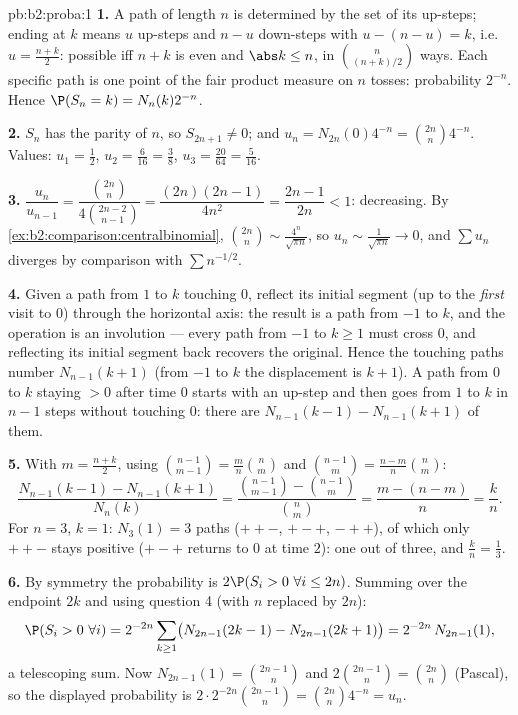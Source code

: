 \begin{solution}{pb:b2:proba:1}
\textbf{1.} A path of length $n$ is determined by the set of
its up-steps; ending at $k$ means $u$ up-steps and $n - u$
down-steps with $u - (n - u) = k$, i.e.\ $u = \frac{n+k}2$:
possible iff $n + k$ is even and $\abs k \leq n$, in
$\binom{n}{(n+k)/2}$ ways. Each specific path is one point of
the fair product measure on $n$ tosses: probability $2^{-n}$.
Hence $\P(S_n = k) = N_n(k)2^{-n}$.

\textbf{2.} $S_n$ has the parity of $n$, so $S_{2n+1} \neq
0$; and $u_n = N_{2n}(0)4^{-n} = \binom{2n}n4^{-n}$. Values:
$u_1 = \frac12$, $u_2 = \frac6{16} = \frac38$, $u_3 =
\frac{20}{64} = \frac5{16}$.

\textbf{3.} $\dfrac{u_n}{u_{n-1}} =
\dfrac{\binom{2n}n}{4\binom{2n-2}{n-1}} =
\dfrac{(2n)(2n-1)}{4n^2} = \dfrac{2n-1}{2n} < 1$: decreasing.
By \cref{ex:b2:comparison:centralbinomial}, $\binom{2n}n \sim
\frac{4^n}{\sqrt{\pi n}}$, so $u_n \sim \frac1{\sqrt{\pi n}}
\to 0$, and $\sum u_n$ diverges by comparison with $\sum
n^{-1/2}$.

\textbf{4.} Given a path from $1$ to $k$ touching $0$,
reflect its initial segment (up to the \emph{first} visit to
$0$) through the horizontal axis: the result is a path from
$-1$ to $k$, and the operation is an involution --- every
path from $-1$ to $k \geq 1$ must cross $0$, and reflecting
its initial segment back recovers the original. Hence the
touching paths number $N_{n-1}(k + 1)$ (from $-1$ to $k$ the
displacement is $k + 1$). A path from $0$ to $k$ staying $>
0$ after time $0$ starts with an up-step and then goes from
$1$ to $k$ in $n - 1$ steps without touching $0$: there are
$N_{n-1}(k-1) - N_{n-1}(k+1)$ of them.

\textbf{5.} With $m = \frac{n+k}2$, using
$\binom{n-1}{m-1} = \frac mn\binom nm$ and $\binom{n-1}{m} =
\frac{n-m}n\binom nm$:
\[
\frac{N_{n-1}(k-1) - N_{n-1}(k+1)}{N_n(k)}
= \frac{\binom{n-1}{m-1} - \binom{n-1}{m}}{\binom nm}
= \frac{m - (n - m)}{n} = \frac kn .
\]
For $n = 3$, $k = 1$: $N_3(1) = 3$ paths ($++-$, $+-+$,
$-++$), of which only $++-$ stays positive ($+-+$ returns to
$0$ at time $2$): one out of three, and $\frac kn = \frac13$.

\textbf{6.} By symmetry the probability is $2\P(S_i > 0\ \forall
i \leq 2n)$. Summing over the endpoint $2k$ and using
question 4 (with $n$ replaced by $2n$):
\[
\P(S_i > 0\ \forall i) = 2^{-2n}\sum_{k\geq1}
\bigl(N_{2n-1}(2k-1) - N_{2n-1}(2k+1)\bigr)
= 2^{-2n}\,N_{2n-1}(1),
\]
a telescoping sum. Now $N_{2n-1}(1) = \binom{2n-1}{n}$ and
$2\binom{2n-1}n = \binom{2n}n$ (Pascal), so the displayed
probability is $2\cdot2^{-2n}\binom{2n-1}n =
\binom{2n}n4^{-n} = u_n$.


\end{solution}
